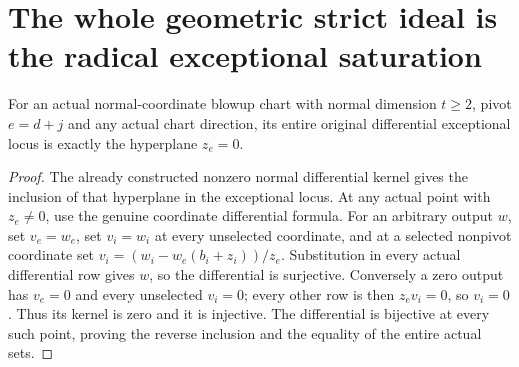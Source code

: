 \section{The whole geometric strict ideal is the radical exceptional saturation}

\begin{theorem}
\label{hir:actual-normal-blowup-exceptional-locus-exact}
\leanok
For an actual normal-coordinate blowup chart with normal dimension
$t\ge2$, pivot $e=d+j$ and any actual chart direction, its entire original
differential exceptional locus is exactly the hyperplane $z_e=0$.
\end{theorem}
\begin{proof}
The already constructed nonzero normal differential kernel gives the
inclusion of that hyperplane in the exceptional locus. At any actual
point with $z_e\ne0$, use the genuine coordinate differential formula.
For an arbitrary output $w$, set $v_e=w_e$, set $v_i=w_i$ at every
unselected coordinate, and at a selected nonpivot coordinate set
$v_i=(w_i-w_e(b_i+z_i))/z_e$. Substitution in every actual differential
row gives $w$, so the differential is surjective. Conversely a zero
output has $v_e=0$ and every unselected $v_i=0$; every other row is then
$z_ev_i=0$, so $v_i=0$. Thus its kernel is zero and it is injective. The
differential is bijective at every such point, proving the reverse
inclusion and the equality of the entire actual sets.
\end{proof}

